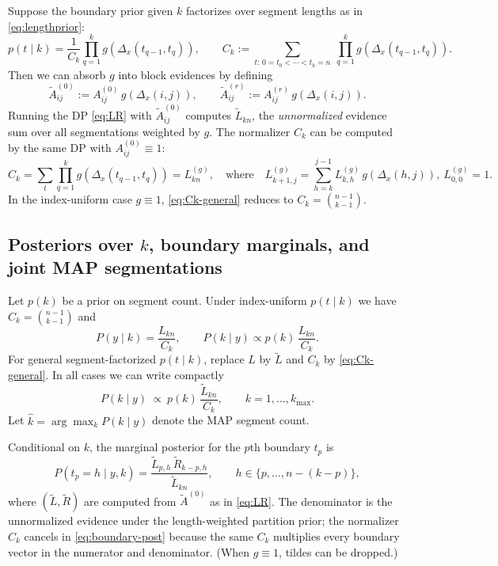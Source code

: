Suppose the boundary prior given $k$ factorizes over segment lengths as in \eqref{eq:lengthprior}:
\[
p(t\mid k) = \frac{1}{C_k}\prod_{q=1}^k g(\Delta_x(t_{q-1},t_q)),
\qquad
C_k := \sum_{t:\,0=t_0<\cdots<t_k=n}\ \prod_{q=1}^k g(\Delta_x(t_{q-1},t_q)).
\]
Then we can absorb $g$ into block evidences by defining
\begin{equation}
\widetilde{A}^{(0)}_{ij} := A^{(0)}_{ij}\,g(\Delta_x(i,j)),
\qquad
\widetilde{A}^{(r)}_{ij} := A^{(r)}_{ij}\,g(\Delta_x(i,j)).
\label{eq:Atilde}
\end{equation}
Running the DP \eqref{eq:LR} with $\widetilde{A}^{(0)}_{ij}$ computes $\widetilde{L}_{k n}$,
the \emph{unnormalized} evidence sum over all segmentations weighted by $g$. The normalizer
$C_k$ can be computed by the same DP with $A^{(0)}_{ij}\equiv 1$:
\begin{equation}
C_k
 = \sum_{t}\prod_{q=1}^k g(\Delta_x(t_{q-1},t_q))
 = L^{(g)}_{k n},
\quad\text{where}\quad
L^{(g)}_{k+1,j}=\sum_{h=k}^{j-1}L^{(g)}_{k,h}\,g(\Delta_x(h,j)),\ L^{(g)}_{0,0}=1.
\label{eq:Ck-general}
\end{equation}
In the index-uniform case $g\equiv 1$, \eqref{eq:Ck-general} reduces to $C_k=\binom{n-1}{k-1}$.

\subsection[Posteriors over segment counts, boundary marginals, and joint MAP segmentations]{Posteriors over $k$, boundary marginals, and joint MAP segmentations}
Let $p(k)$ be a prior on segment count. Under index-uniform $p(t\mid k)$ we have
$C_k=\binom{n-1}{k-1}$ and
\[
P(y\mid k) = \frac{L_{k n}}{C_k},
\qquad
P(k\mid y)\propto p(k)\,\frac{L_{k n}}{C_k}.
\]
For general segment-factorized $p(t\mid k)$, replace $L$ by $\widetilde{L}$ and $C_k$ by
\eqref{eq:Ck-general}. In all cases we can write compactly
\begin{equation}
P(k\mid y)\ \propto\ p(k)\,\frac{\widetilde{L}_{k n}}{C_k},
\qquad k=1,\dots,k_{\max}.
\label{eq:post-k}
\end{equation}
Let $\widehat{k}=\arg\max_k P(k\mid y)$ denote the MAP segment count.

Conditional on $k$, the marginal posterior for the $p$th boundary $t_p$ is
\begin{equation}
P(t_p=h\mid y,k)
 = \frac{\widetilde{L}_{p,h}\,\widetilde{R}_{k-p,h}}{\widetilde{L}_{k n}},
\qquad
h\in\{p,\dots,n-(k-p)\},
\label{eq:boundary-post}
\end{equation}
where $(\widetilde{L},\widetilde{R})$ are computed from $\widetilde{A}^{(0)}$ as in
\eqref{eq:LR}. The denominator is the unnormalized evidence under the length-weighted partition
prior; the normalizer $C_k$ cancels in \eqref{eq:boundary-post} because the same $C_k$ multiplies
every boundary vector in the numerator and denominator. (When $g\equiv 1$, tildes can be dropped.)

